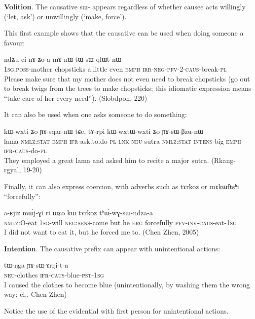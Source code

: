 \documentclass[oldfontcommands,oneside,a4paper,11pt]{article}
\newcommand{\ipa}[1]{{\phon \mbox{#1}}} %
\newcommand{\sg}{\textsc{sg}}
\newcommand{\pl}{\textsc{pl}}
\newcommand{\pfv}{\textsc{pfv}}
\newcommand{\auto}{\textsc{autoben}}
\newcommand{\caus}{\textsc{caus}}
\newcommand{\lnk}{\textsc{lnk}}
\newcommand{\erg}{\textsc{erg}}
\newcommand{\emphat}{\textsc{emph}}
\newcommand{\evd}{\textsc{ifr}}
\newcommand{\intens}{\textsc{intens}}
\newcommand{\inv}{\textsc{inv}}
\newcommand{\irr}{\textsc{irr}}
\newcommand{\negat}{\textsc{neg}}
\newcommand{\neu}{\textsc{neu}}
\newcommand{\nmlz}{\textsc{nmlz}}
\newcommand{\poss}{\textsc{poss}}
\newcommand{\pst}{\textsc{pst}}
\newcommand{\stat}{\textsc{stat}}
\begin{document}
 \textbf{Volition}. The causative \ipa{sɯ-} appears regardless of whether causee acts willingly (`let, ask') or unwillingly (`make, force').
 
 This first example shows that the causative can be used when doing someone a favour:
  \begin{exe}
\ex 
\gll   \ipa{a-mu} 	\ipa{ndʑu} 	\ipa{ci} \ipa{nɤ}	\ipa{ʑo} 	\ipa{a-mɤ-nɯ-tɯ-sɯ-qlɯt-nɯ} \\
  1\sg{}.\poss{}-mother chopsticks a.little even \emphat{} \irr{}-\negat{}-\pfv{}-2-\caus{}-break-\pl{} \\
 \glt    Please make sure that my mother does not even need to break chopsticks (go out to break twigs from the trees to make chopsticks; this idiomatic expression means ``take care of her every need''). (Slobdpon, 220)
\end{exe}

 It can also be used when one asks someone to do something:
 \begin{exe}
\ex 
\gll  \ipa{βlama} 	\ipa{kɯ-wxti} 	\ipa{ʑo} 	\ipa{ɲɤ-sqar-nɯ} 	\ipa{tɕe,} 	\ipa{tɤ-rpi} 	\ipa{kɯ-wxtɯ-wxti} 	\ipa{ʑo} 	\ipa{ɲɤ-sɯ-βzu-nɯ}  \\
lama \nmlz{}:\stat{} \emphat{} \evd{}-ask.to.do-\pl{} \lnk{} \neu{}-sutra \nmlz{}:\stat{}-\intens{}-big \emphat{} \evd{}-\caus{}-do-\pl{} \\
 \glt   They employed a great lama and asked him to recite a major sutra. (Rkang-rgyal, 19-20)
\end{exe}

Finally, it can also express coercion, with adverbs such as \ipa{tɤrkoz} 	or \ipa{mɤkɯftsʰi} ``forcefully'':
 \begin{exe}
\ex 
\gll \ipa{kɤ-ndza} 	\ipa{a-ʁjiz} 	\ipa{mɯ́j-ɣi} 	\ipa{ri} 	\ipa{ɯʑo} 	\ipa{kɯ} 	\ipa{tɤrkoz} 	\ipa{tʰɯ́-wɣ-sɯ-ndza-a} \\
\nmlz{}:O-eat 1\sg{}-will \negat{}:\textsc{sens}-come but he \erg{} forcefully \pfv{}-\inv{}-\caus{}-eat-1\sg{} \\
 \glt   I did not want to eat it, but he forced me to. (Chen Zhen, 2005)
\end{exe}

 
   \textbf{Intention}. The causative prefix can appear with unintentional actions:
 \begin{exe}
\ex 
\gll 
\ipa{tɯ-ŋga} 	\ipa{ɲɤ-sɯ-ɤrŋi-t-a} \\
	\neu{}-clothes \evd{}-\caus{}-blue-\pst{}-1\sg{} \\
 \glt   I caused the clothes to become blue (unintentionally, by washing them the wrong way; el., Chen Zhen)
\end{exe}
Notice the use of the evidential with first person for unintentional actions.
 	
\end{document}
